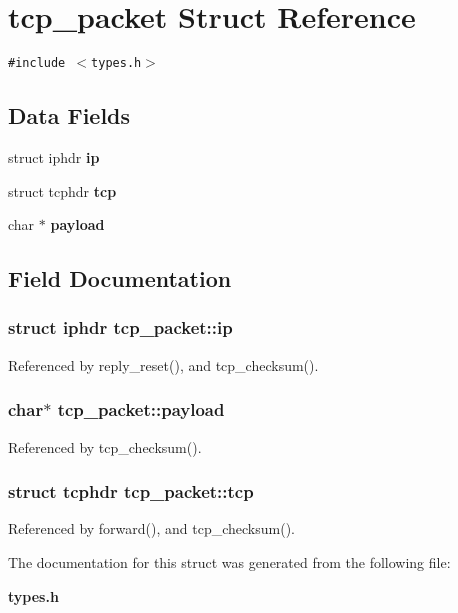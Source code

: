 \section{tcp\_\-packet Struct Reference}
\label{structtcp__packet}
{\tt \#include $<$types.h$>$}

\subsection*{Data Fields}
\begin{CompactItemize}
\item 
struct iphdr {\bf ip}
\item 
struct tcphdr {\bf tcp}
\item 
char $\ast$ {\bf payload}
\end{CompactItemize}


\subsection{Field Documentation}
\subsubsection[{ip}]{\setlength{\rightskip}{0pt plus 5cm}struct iphdr {\bf tcp\_\-packet::ip}\hspace{0.3cm}{\tt  [read]}}\label{structtcp__packet_9016cf6c4a1dcd03d52767d8898c1379}




Referenced by reply\_\-reset(), and tcp\_\-checksum().
\subsubsection[{payload}]{\setlength{\rightskip}{0pt plus 5cm}char$\ast$ {\bf tcp\_\-packet::payload}}\label{structtcp__packet_c54b92258b03570a44fd443743a4f289}




Referenced by tcp\_\-checksum().
\subsubsection[{tcp}]{\setlength{\rightskip}{0pt plus 5cm}struct tcphdr {\bf tcp\_\-packet::tcp}\hspace{0.3cm}{\tt  [read]}}\label{structtcp__packet_5a2898cc2d3a601784883ff042e96592}




Referenced by forward(), and tcp\_\-checksum().

The documentation for this struct was generated from the following file:\begin{CompactItemize}
\item 
{\bf types.h}\end{CompactItemize}
